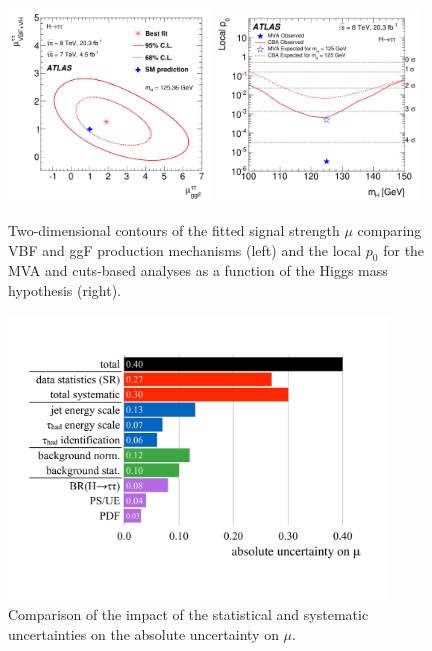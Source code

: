 \begin{figure}[tp]
  \centering
  \includegraphics[width=0.48\textwidth]{figures/HIGG-2013-32/fig_12}
  \includegraphics[width=0.48\textwidth]{figures/HIGG-2013-32/fig_14}
  \caption{Two-dimensional contours of the fitted signal strength $\mu$ comparing VBF and ggF production mechanisms (left) and the local $p_0$ for the MVA and cuts-based analyses as a function of the Higgs mass hypothesis (right).}
  \label{fig:results-mup0}
\end{figure}

\begin{figure}[tp]
  \centering
  \includegraphics[width=0.90\textwidth]{figures/HIGG-2013-32/uncertainties}
  \caption{Comparison of the impact of the statistical and systematic uncertainties on the absolute uncertainty on $\mu$.}
  \label{fig:results-uncertainties-1}
\end{figure}


